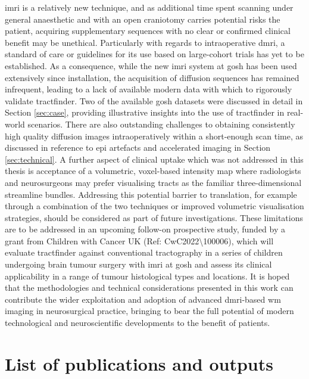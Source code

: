 \Gls{imri} is a relatively new technique, and as additional time spent scanning under general anaesthetic and with an open craniotomy carries potential risks the patient, acquiring supplementary sequences with no clear or confirmed clinical benefit may be unethical.
Particularly with regards to intraoperative \gls{dmri}, a standard of care or guidelines for its use based on large-cohort trials has yet to be established.
As a consequence, while the new \gls{imri} system at \gls{gosh} has been used extensively since installation, the acquisition of diffusion sequences has remained infrequent, leading to a lack of available modern data with which to rigorously validate tractfinder.
Two of the available \gls{gosh} datasets were discussed in detail in Section \ref{sec:case}, providing illustrative insights into the use of tractfinder in real-world scenarios.
There are also outstanding challenges to obtaining consistently high quality diffusion images intraoperatively within a short-enough scan time, as discussed in reference to \gls{epi} artefacts and accelerated imaging in Section \ref{sec:technical}.
A further aspect of clinical uptake which was not addressed in this thesis is acceptance of a volumetric, voxel-based intensity map where radiologists and neurosurgeons may prefer visualising tracts as the familiar three-dimensional streamline bundles.
Addressing this potential barrier to translation, for example through a combination of the two techniques or improved volumetric visualisation strategies, should be considered as part of future investigations.
These limitations are to be addressed in an upcoming follow-on prospective study, funded by a grant from Children with Cancer UK (Ref: CwC2022\textbackslash 100006), which will evaluate tractfinder against conventional tractography in a series of children undergoing brain tumour surgery with \gls{imri} at \gls{gosh} and assess its clinical applicability in a range of tumour histological types and locations.
It is hoped that the methodologies and technical considerations presented in this work can contribute the wider exploitation and adoption of advanced \gls{dmri}-based \gls{wm} imaging in neurosurgical practice, bringing to bear the full potential of modern technological and neuroscientific developments to the benefit of patients.

\chapter*{List of publications and outputs}

